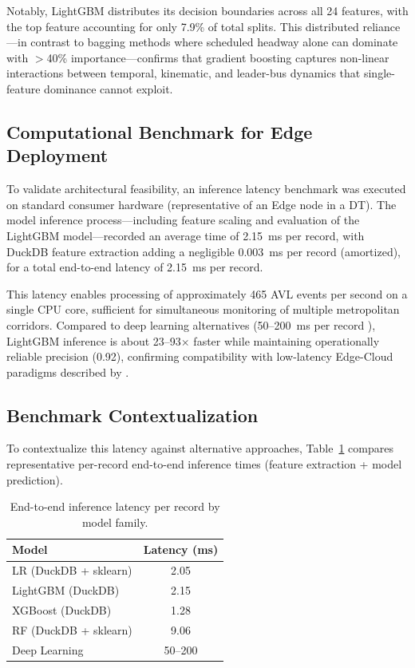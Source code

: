\documentclass[fleqn,10pt,lineno]{wlpeerj}
\begin{document}
Notably, LightGBM distributes its decision boundaries across all 24 features, with the top feature accounting for only 7.9\% of total splits. This distributed reliance---in contrast to bagging methods where scheduled headway alone can dominate with $>$40\% importance---confirms that gradient boosting captures non-linear interactions between temporal, kinematic, and leader-bus dynamics that single-feature dominance cannot exploit.

\subsection{Computational Benchmark for Edge Deployment}

To validate architectural feasibility, an inference latency benchmark was executed on standard
consumer hardware (representative of an Edge node in a DT). The model inference process---including feature scaling and evaluation of the LightGBM model---recorded an average time of \SI{2.15}{\ms} per record, with DuckDB feature extraction adding a negligible \SI{0.003}{\ms} per record (amortized), for a total end-to-end latency of \SI{2.15}{\ms} per record.

This latency enables processing of approximately 465 AVL events per second on a
single CPU core, sufficient for simultaneous monitoring of multiple metropolitan corridors. Compared to deep learning alternatives (50--200~ms per record \citep{19}), LightGBM inference is about 23--93$\times$ faster while maintaining operationally reliable precision (0.92), confirming compatibility with low-latency Edge-Cloud paradigms described by
\citet{26}.

\subsection{Benchmark Contextualization}

To contextualize this latency against alternative approaches,
Table~\ref{tab:benchmark_context} compares representative per-record end-to-end inference times (feature extraction + model prediction).

\begin{table}[htbp]
  \caption{End-to-end inference latency per record by model family.}
  \centering
  \begin{tabular}{@{}lc@{}}
    \toprule
    \textbf{Model} & \textbf{Latency (ms)} \\ \midrule
    LR (DuckDB + sklearn)    & 2.05         \\
    LightGBM (DuckDB)        & 2.15         \\
    XGBoost (DuckDB)         & 1.28         \\
    RF (DuckDB + sklearn)    & 9.06         \\
    Deep Learning \citep{19} & 50--200      \\ \bottomrule
  \end{tabular}
  \label{tab:benchmark_context}
\end{table}
\end{document}
